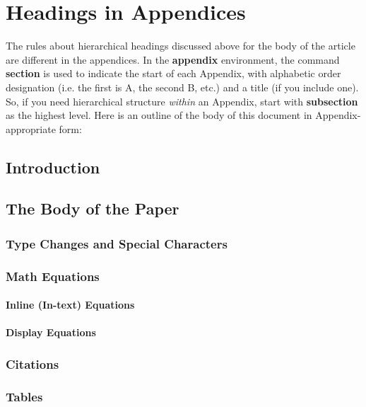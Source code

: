 \documentclass{sig-alternate}
\begin{document}
%

%
%
\appendix
\section{Headings in Appendices}
The rules about hierarchical headings discussed above for
the body of the article are different in the appendices.
In the \textbf{appendix} environment, the command
\textbf{section} is used to
indicate the start of each Appendix, with alphabetic order
designation (i.e. the first is A, the second B, etc.) and
a title (if you include one).  So, if you need
hierarchical structure
\textit{within} an Appendix, start with \textbf{subsection} as the
highest level. Here is an outline of the body of this
document in Appendix-appropriate form:
\subsection{Introduction}
\subsection{The Body of the Paper}
\subsubsection{Type Changes and  Special Characters}
\subsubsection{Math Equations}
\paragraph{Inline (In-text) Equations}
\paragraph{Display Equations}
\subsubsection{Citations}
\subsubsection{Tables}
\end{document}
